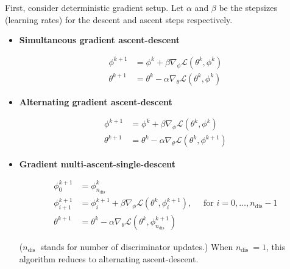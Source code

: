 \documentclass{report}
\begin{document}
\begin{definition}
    First, consider deterministic gradient setup. Let $\alpha$ and $\beta$ be the stepsizes (learning rates) for the descent and ascent steps respectively.

    \begin{itemize}
        \item
        \textbf{Simultaneous gradient ascent-descent}

        $$
        \begin{aligned}
        \phi^{k+1} & =\phi^{k}+\beta \nabla_{\phi} \mathcal{L}\left(\theta^{k}, \phi^{k}\right) \\
        \theta^{k+1} & =\theta^{k}-\alpha \nabla_{\theta} \mathcal{L}\left(\theta^{k}, \phi^{k}\right)
        \end{aligned}
        $$
        \item
        \textbf{Alternating gradient ascent-descent}

        $$
        \begin{aligned}
        \phi^{k+1} & =\phi^{k}+\beta \nabla_{\phi} \mathcal{L}\left(\theta^{k}, \phi^{k}\right) \\
        \theta^{k+1} & =\theta^{k}-\alpha \nabla_{\theta} \mathcal{L}\left(\theta^{k}, \phi^{k+1}\right)
        \end{aligned}
        $$
        \item
        \textbf{Gradient multi-ascent-single-descent}

        $$
        \begin{aligned}
        \phi_{0}^{k+1} & =\phi_{n_{\mathrm{dis}}}^{k} \\
        \phi_{i+1}^{k+1} & =\phi_{i}^{k+1}+\beta \nabla_{\phi} \mathcal{L}\left(\theta^{k}, \phi_{i}^{k+1}\right), \quad \text { for } i=0, \ldots, n_{\mathrm{dis}}-1 \\
        \theta^{k+1} & =\theta^{k}-\alpha \nabla_{\theta} \mathcal{L}\left(\theta^{k}, \phi_{n_{\mathrm{dis}}}^{k+1}\right)
        \end{aligned}
        $$

        ($n_{\text {dis }}$ stands for number of discriminator updates.)
        When $n_{\text {dis }}=1$, this algorithm reduces to alternating ascent-descent.
    \end{itemize}
\end{definition}
\end{document}
